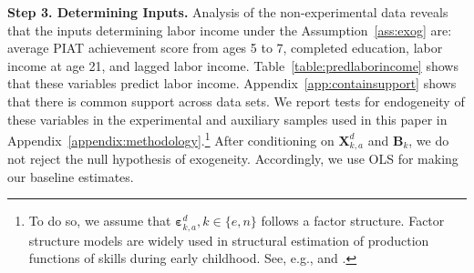 \textbf{Step 3. Determining Inputs.} Analysis of the non-experimental data reveals that the inputs determining labor income under the Assumption~\ref{ass:exog} are: average PIAT achievement score from ages 5 to 7, completed education, labor income at age 21, and lagged labor income. Table~\ref{table:predlaborincome} shows that these variables predict labor income. Appendix~\ref{app:containsupport} shows that there is common support across data sets. We report tests for endogeneity of these variables in the experimental and auxiliary samples used in this paper in Appendix~\ref{appendix:methodology}.\footnote{To do so, we assume that $\bm{\varepsilon}_{k,a}^d, k \in \{e,n\}$ follows a factor structure. Factor structure models are widely used in structural estimation of production functions of skills during early childhood. See, e.g., \citet{Cunha_Heckman_2008_JHR} and \citet{Cunha_Heckman_etal_2010_est_tech_cognoncog}.} After conditioning on $\bm{X}_{k,a}^d$ and $\bm{B}_{k}$, we do not reject the null hypothesis of exogeneity. Accordingly, we use OLS for making our baseline estimates.


